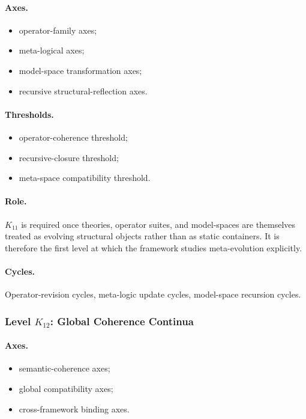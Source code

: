 \paragraph{Axes.}
\begin{itemize}
    \item operator-family axes;
    \item meta-logical axes;
    \item model-space transformation axes;
    \item recursive structural-reflection axes.
\end{itemize}

\paragraph{Thresholds.}
\begin{itemize}
    \item operator-coherence threshold;
    \item recursive-closure threshold;
    \item meta-space compatibility threshold.
\end{itemize}

\paragraph{Role.}
\(K_{11}\) is required once theories, operator suites, and model-spaces are
themselves treated as evolving structural objects rather than as static
containers. It is therefore the first level at which the framework studies
meta-evolution explicitly.

\paragraph{Cycles.}
Operator-revision cycles, meta-logic update cycles, model-space recursion
cycles.

\subsubsection{Level \(K_{12}\): Global Coherence Continua}

\paragraph{Axes.}
\begin{itemize}
    \item semantic-coherence axes;
    \item global compatibility axes;
    \item cross-framework binding axes.
\end{itemize}

